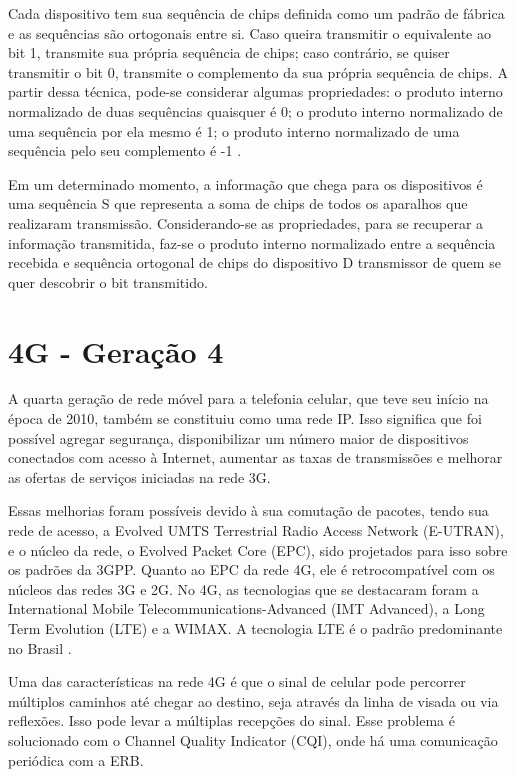 \documentclass[11pt,oneside,a4paper]{abntex2}
\begin{document}
Cada dispositivo tem sua sequência de chips definida como um padrão de fábrica e as sequências são ortogonais entre si. Caso queira transmitir o equivalente ao bit 1, transmite sua própria sequência de chips; caso contrário, se quiser transmitir o bit 0, transmite o complemento da sua própria sequência de chips. A partir dessa técnica, pode-se considerar algumas propriedades: o produto interno normalizado de duas sequências quaisquer é 0; o produto interno normalizado de uma sequência por ela mesmo é 1; o produto interno normalizado de uma sequência pelo seu complemento é -1 \cite{aula4}.

Em um determinado momento, a informação que chega para os dispositivos é uma sequência S que representa a soma de chips de todos os aparalhos que realizaram transmissão. Considerando-se as propriedades, para se recuperar a informação transmitida, faz-se o produto interno normalizado entre a sequência recebida e sequência ortogonal de chips do dispositivo D transmissor de quem se quer descobrir o bit transmitido.

\section*{4G - Geração 4}
\label{4g}

A quarta geração de rede móvel para a telefonia celular, que teve seu início na época de 2010, também se constituiu como uma rede IP. Isso significa que foi possível agregar segurança, disponibilizar um número maior de dispositivos conectados com acesso à Internet, aumentar as taxas de transmissões e melhorar as ofertas de serviços iniciadas na rede 3G.

Essas melhorias foram possíveis devido à sua comutação de pacotes, tendo sua rede de acesso, a Evolved UMTS Terrestrial Radio Access Network (E-UTRAN), e o núcleo da rede, o Evolved Packet Core (EPC), sido projetados para isso sobre os padrões da 3GPP. Quanto ao EPC da rede 4G, ele é retrocompatível com os núcleos das redes 3G e 2G. No 4G, as tecnologias que se destacaram foram a International Mobile Telecommunications-Advanced (IMT Advanced), a Long Term Evolution (LTE) \cite{aula5} e a WIMAX. A tecnologia LTE é o padrão predominante no Brasil \cite{tcc2}.

Uma das características na rede 4G é que o sinal de celular pode percorrer múltiplos caminhos até chegar ao destino, seja através da linha de visada ou via reflexões. Isso pode levar a múltiplas recepções do sinal. Esse problema é solucionado com o Channel Quality Indicator (CQI), onde há uma comunicação periódica com a ERB.
\end{document}
